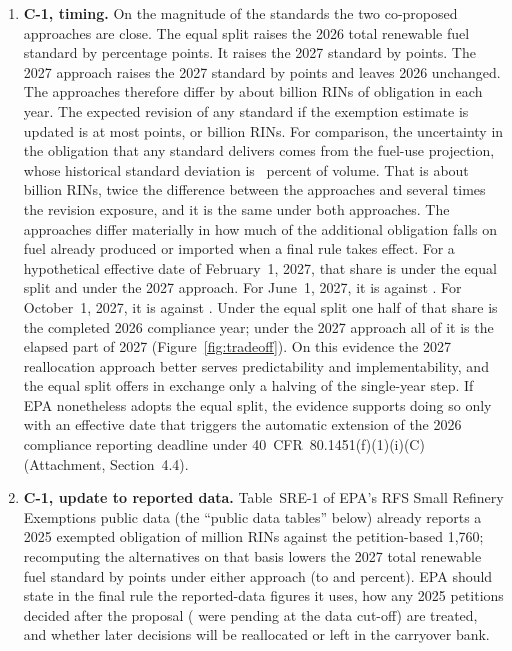 \documentclass[11pt]{article}
\newcommand{\AttSecDeadlines}{4.4}
\begin{document}
\begin{enumerate}
\item \textbf{C-1, timing.} On the magnitude of the standards the two co-proposed approaches are close. The equal split raises the 2026 total renewable fuel standard by \valstepFirstEqual{} percentage points. It raises the 2027 standard by \valstepSecondEqual{} points. The 2027 approach raises the 2027 standard by \valstepSecondAllSecond{} points and leaves 2026 unchanged. The approaches therefore differ by about \valstepEqualBRinsSecond{} billion RINs of obligation in each year. The expected revision of any standard if the exemption estimate is updated is at most \valrevisionMeanAbsSecondAllSecond{} points, or \valrevisionMeanAbsBRinsSecondAllSecond{} billion RINs. For comparison, the uncertainty in the obligation that any standard delivers comes from the fuel-use projection, whose historical standard deviation is \valfuelErrorSdPct{}~percent of volume. That is about \valrealizedMinusIntendedSdSecondEqual{} billion RINs, twice the difference between the approaches and several times the revision exposure, and it is the same under both approaches. The approaches differ materially in how much of the additional obligation falls on fuel already produced or imported when a final rule takes effect. For a hypothetical effective date of February~1, 2027, that share is \valretroEqualScenarioHypotheticalEarlyTwoZeroTwoSeven{} under the equal split and \valretroAllSecondScenarioHypotheticalEarlyTwoZeroTwoSeven{} under the 2027 approach. For June~1, 2027, it is \valretroEqualScenarioHypotheticalMidTwoZeroTwoSeven{} against \valretroAllSecondScenarioHypotheticalMidTwoZeroTwoSeven{}. For October~1, 2027, it is \valretroEqualScenarioHypotheticalLateTwoZeroTwoSeven{} against \valretroAllSecondScenarioHypotheticalLateTwoZeroTwoSeven{}. Under the equal split one half of that share is the completed 2026 compliance year; under the 2027 approach all of it is the elapsed part of 2027 (Figure~\ref{fig:tradeoff}). On this evidence the 2027 reallocation approach better serves predictability and implementability, and the equal split offers in exchange only a halving of the single-year step. If EPA nonetheless adopts the equal split, the evidence supports doing so only with an effective date that triggers the automatic extension of the 2026 compliance reporting deadline under 40~CFR~80.1451(f)(1)(i)(C) (Attachment, Section~\AttSecDeadlines).
\item \textbf{C-1, update to reported data.} Table~SRE-1 of EPA's RFS Small Refinery Exemptions public data (the ``public data tables'' below) already reports a 2025 exempted obligation of \valreportedTwoZeroTwoFiveExemptedRvo{} million RINs against the petition-based 1,760; recomputing the alternatives on that basis lowers the 2027 total renewable fuel standard by \valreportedBasisMaxChangePoints{} points under either approach (to \valreportedBasisStdSecondEqual{} and \valreportedBasisStdSecondAllSecond{} percent). EPA should state in the final rule the reported-data figures it uses, how any 2025 petitions decided after the proposal (\valnPendingTwoZeroTwoFive{} were pending at the data cut-off) are treated, and whether later decisions will be reallocated or left in the carryover bank.

\end{enumerate}
\end{document}
